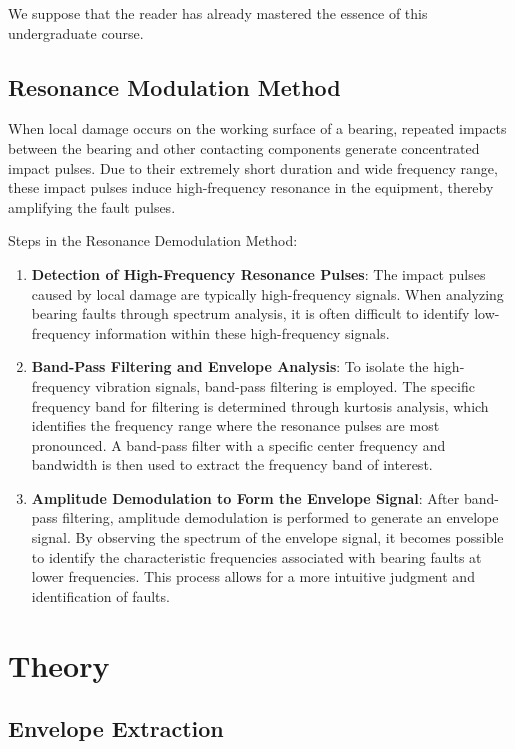 \documentclass[conference]{IEEEtran}
\begin{document}
We suppose that the reader has already mastered the essence of this undergraduate course.

\subsection{Resonance Modulation Method}

When local damage occurs on the working surface of a bearing, repeated impacts between the bearing and other contacting components generate concentrated impact pulses. Due to their extremely short duration and wide frequency range, these impact pulses induce high-frequency resonance in the equipment, thereby amplifying the fault pulses.

Steps in the Resonance Demodulation Method:
\begin{enumerate}
    \item \textbf{Detection of High-Frequency Resonance Pulses}: The impact pulses caused by local damage are typically high-frequency signals. When analyzing bearing faults through spectrum analysis, it is often difficult to identify low-frequency information within these high-frequency signals.
    \item \textbf{Band-Pass Filtering and Envelope Analysis}: To isolate the high-frequency vibration signals, band-pass filtering is employed. The specific frequency band for filtering is determined through kurtosis analysis, which identifies the frequency range where the resonance pulses are most pronounced. A band-pass filter with a specific center frequency and bandwidth is then used to extract the frequency band of interest.
    \item \textbf{Amplitude Demodulation to Form the Envelope Signal}: After band-pass filtering, amplitude demodulation is performed to generate an envelope signal. By observing the spectrum of the envelope signal, it becomes possible to identify the characteristic frequencies associated with bearing faults at lower frequencies. This process allows for a more intuitive judgment and identification of faults.
\end{enumerate}

\section{Theory}
\subsection{Envelope Extraction}\label{env}
\end{document}
